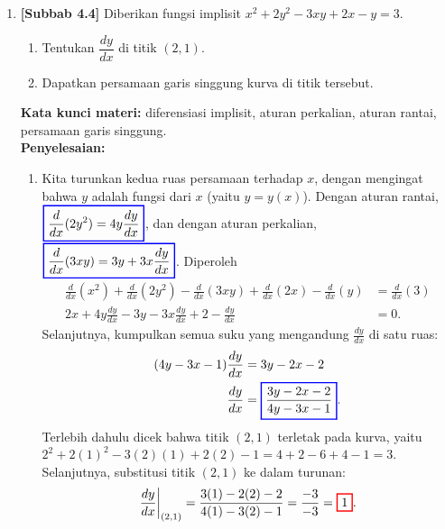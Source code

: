 \documentclass[10pt,openany,a4paper]{article}
\theoremstyle{definition}
\theoremstyle{definition}
\theoremstyle{plain}
\newenvironment{jawab}[2][tes]{%
\par\noindent\textbf{Kata kunci materi:} #1.\\
\textbf{Penyelesaian:} #2%
}{}
\begin{document}
\begin{enumerate}
    \item \textbf{[Subbab 4.4]} Diberikan fungsi implisit $x^2+2y^2-3xy+2x-y=3$.
    \begin{enumerate}
        \item Tentukan $\dfrac{dy}{dx}$ di titik $(2,1)$.
        \item Dapatkan persamaan garis singgung kurva di titik tersebut.
    \end{enumerate}
    \begin{jawab}[diferensiasi implisit, aturan perkalian, aturan rantai, persamaan garis singgung]{
        \begin{enumerate}
            \item Kita turunkan kedua ruas persamaan terhadap $x$, dengan mengingat bahwa $y$ adalah fungsi dari $x$ (yaitu $y=y(x)$). Dengan aturan rantai, $\colorlet{oldcolor}{.}
        \color{blue}
        \setlength{\fboxrule}{1pt} \boxed{\color{oldcolor}\frac{d}{dx}(2y^2) = 4y\frac{dy}{dx}}\color{oldcolor}$, dan dengan aturan perkalian, $\colorlet{oldcolor}{.}
        \color{blue}
        \setlength{\fboxrule}{1pt} \boxed{\color{oldcolor}\frac{d}{dx}(3xy) = 3y + 3x\frac{dy}{dx}}\color{oldcolor}$. Diperoleh
            \begin{align*}
                \frac{d}{dx}(x^2) + \frac{d}{dx}(2y^2) - \frac{d}{dx}(3xy) + \frac{d}{dx}(2x) - \frac{d}{dx}(y) &= \frac{d}{dx}(3)\\
                2x + 4y\frac{dy}{dx} - 3y - 3x\frac{dy}{dx} + 2 - \frac{dy}{dx} &= 0.
            \end{align*}
            Selanjutnya, kumpulkan semua suku yang mengandung $\frac{dy}{dx}$ di satu ruas:
            \begin{align*}
                (4y - 3x - 1)\frac{dy}{dx} &= 3y - 2x - 2\\
                \frac{dy}{dx} &= \colorlet{oldcolor}{.}
        \color{blue}
        \setlength{\fboxrule}{1pt} \boxed{\color{oldcolor}\frac{3y - 2x - 2}{4y - 3x - 1}}\color{oldcolor}.
            \end{align*}
            Terlebih dahulu dicek bahwa titik $(2,1)$ terletak pada kurva, yaitu $2^2+2(1)^2-3(2)(1)+2(2)-1=4+2-6+4-1=3$. Selanjutnya, substitusi titik $(2,1)$ ke dalam turunan:
            \begin{align*}
                \frac{dy}{dx}\bigg|_{(2,1)} = \frac{3(1) - 2(2) - 2}{4(1) - 3(2) - 1} = \frac{-3}{-3} = \colorlet{oldcolor}{.}
        \color{red}
        \setlength{\fboxrule}{1pt} \boxed{\color{oldcolor}1}\color{oldcolor}.
            \end{align*}

\end{enumerate}}
\end{jawab}
\end{enumerate}
\end{document}
